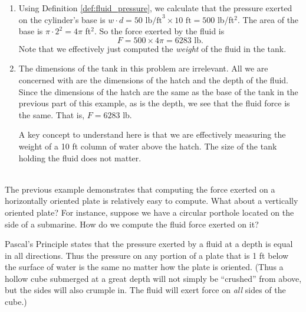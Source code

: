 {\begin{enumerate}
	\item	Using Definition \ref{def:fluid_pressure}, we calculate that the pressure exerted on the cylinder's base is $w\cdot d = 50 \text{ lb/ft}^3\times 10\text{ ft} = 500$ lb/ft$^2$. The area of the base is $\pi\cdot 2^2 = 4\pi$ ft$^2$. So the force exerted by the fluid is 
	$$F = 500\times 4\pi = 6283\text{ lb}.$$
Note that we effectively just computed the \textit{weight} of the fluid in the tank.

	\item		The dimensions of the tank in this problem are irrelevant. All we are concerned with are the dimensions of the hatch and the depth of the fluid. Since the dimensions of the hatch are the same as the base of the tank in the previous part of this example, as is the depth, we see that the fluid force is the same. That is, $F = 6283$ lb. 
	
	A key concept to understand here is that we are effectively measuring the weight of a 10 ft column of water above the hatch. The size of the tank holding the fluid does not matter.
\end{enumerate}
\baselineskip
}\\

The previous example demonstrates that computing the force exerted on a horizontally oriented plate is relatively easy to compute. What about a vertically oriented plate? For instance, suppose we have a circular porthole located on the side of a submarine. How do we compute the fluid force exerted on it?

Pascal's Principle states  that the pressure exerted by a fluid at a depth is equal in all directions. Thus the pressure on any portion of a plate that is 1 ft below the surface of water is the same no matter how the plate is oriented. (Thus a hollow cube submerged at a great depth will not simply be ``crushed'' from above, but the sides will also crumple in. The fluid will exert force on \textit{all} sides of the cube.)

